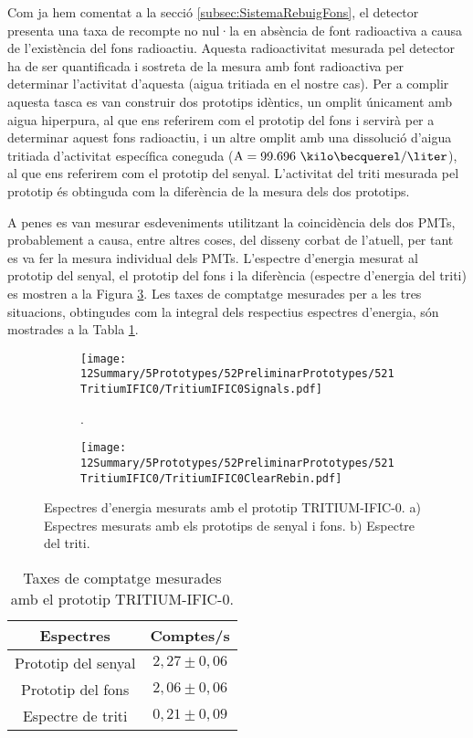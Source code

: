 Com ja hem comentat a la secció \ref{subsec:SistemaRebuigFons}, el detector presenta una taxa de recompte no nul·la en absència de font radioactiva a causa de l'existència del fons radioactiu. Aquesta radioactivitat mesurada pel detector ha de ser quantificada i sostreta de la mesura amb font radioactiva per determinar l'activitat d'aquesta (aigua tritiada en el nostre cas). Per a complir aquesta tasca es van construir dos prototips idèntics, un omplit únicament amb aigua hiperpura, al que ens referirem com el prototip del fons i servirà per a determinar aquest fons radioactiu, i un altre omplit amb una dissolució d'aigua tritiada d'activitat específica coneguda ($\text{A}=99.696~\kilo\becquerel/\liter$), al que ens referirem com el prototip del senyal. L'activitat del triti mesurada pel prototip és obtinguda com la diferència de la mesura dels dos prototips.

A penes es van mesurar esdeveniments utilitzant la coincidència dels dos PMTs, probablement a causa, entre altres coses, del disseny corbat de l'atuell, per tant es va fer la mesura individual dels PMTs. L'espectre d'energia mesurat al prototip del senyal, el prototip del fons i la diferència (espectre d'energia del triti) es mostren a la Figura \ref{fig:EspectresEnergeticsTritiumIFIC0}. Les taxes de comptatge mesurades per a les tres situacions, obtingudes com la integral dels respectius espectres d'energia, són mostrades a la Tabla \ref{tab:ContesPerSegonTRITIUMIFIC0}. 

\begin{figure}
\centering
    \begin{subfigure}[b]{1\textwidth}
    \centering
    \texttt{[image: 12Summary/5Prototypes/52PreliminarPrototypes/521TritiumIFIC0/TritiumIFIC0Signals.pdf]}  
    \caption{.\label{subfig:EspectreSenyalFonsTritiumIFIC0}}
    \end{subfigure}
    \hfill
    \begin{subfigure}[b]{1\textwidth}
    \centering
    \texttt{[image: 12Summary/5Prototypes/52PreliminarPrototypes/521TritiumIFIC0/TritiumIFIC0ClearRebin.pdf]}  
    \caption{\label{subfig:EspectreTritiTritiumIFIC0}}
    \end{subfigure}
 \caption{Espectres d'energia mesurats amb el prototip TRITIUM-IFIC-0. a) Espectres mesurats amb els prototips de senyal i fons. b) Espectre del triti.}
 \label{fig:EspectresEnergeticsTritiumIFIC0}
\end{figure}

\begin{table}[htbp]
\centering{}%
\begin{tabular}{cc}
\toprule 
Espectres & Comptes/s\tabularnewline
\midrule
\midrule 
Prototip del senyal & $2,27 \pm 0,06$ \tabularnewline
Prototip del fons & $2,06 \pm 0,06$ \tabularnewline  
Espectre de triti & $0,21 \pm 0,09$ \tabularnewline
\bottomrule
\end{tabular}
\caption{Taxes de comptatge mesurades amb el prototip TRITIUM-IFIC-0.}
\label{tab:ContesPerSegonTRITIUMIFIC0}
\end{table}

